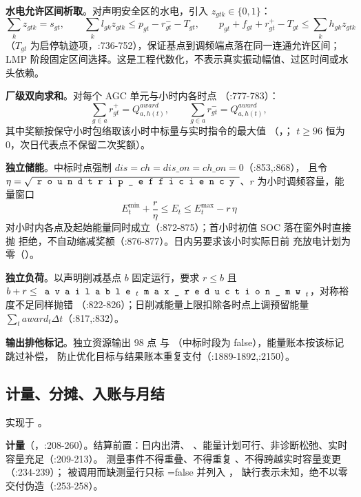 \textbf{水电允许区间析取}。对声明安全区的水电，引入 $z_{gtk}\in\{0,1\}$：
\begin{equation}
 \sum_k z_{gtk}=s_{gt},\qquad
 \sum_k l_{gk}z_{gtk}\le p_{gt}-r^-_{gt}-T_{gt},\qquad
 p_{gt}+f_{gt}+r^+_{gt}-T_{gt}\le\sum_k h_{gk}z_{gtk}
\end{equation}
（$T_{gt}$ 为启停轨迹项，:736-752），保证基点到调频端点落在同一连通允许区间；
LMP 阶段固定区间选择。这是工程代数化，不表示真实振动幅值、过区时间或水头依赖。

\textbf{厂级双向求和}。对每个 AGC 单元与小时内各时点
（:777-783）：
\begin{equation}
 \sum_{g\in a}r^+_{gt}=Q^{award}_{a,h(t)},\qquad
 \sum_{g\in a}r^-_{gt}=Q^{award}_{a,h(t)},
\end{equation}
其中奖额按保守小时包络取该小时中标量与实时指令的最大值
（，；
$t\ge96$ 恒为 0，次日代表点不保留二次奖额）。

\textbf{独立储能}。中标时点强制 $dis=ch=dis\_on=ch\_on=0$（:853,:868），
且令 $\eta=\sqrt{\fld{roundtrip\_efficiency}}$、$r$ 为小时调频容量，能量窗口
\begin{equation}
 E^{\min}_t+\frac{r}{\eta}\le E_t\le E^{\max}_t-r\,\eta
\end{equation}
对小时内各点及起始能量同时成立（:872-875）；首小时初值 SOC 落在窗外时直接抛
 拒绝，不自动缩减奖额（:876-877）。日内另要求该小时实际日前
充放电计划为零（）。

\textbf{独立负荷}。以声明削减基点 $b$ 固定运行，要求
$r\le b$ 且 $b+r\le \fld{available}_t\fld{max\_reduction\_mw}_t$，对称裕度不足同样抛错
（:822-826）；日削减能量上限扣除各时点上调预留能量
$\sum_t award_t\Delta t$（:817,:832）。

\textbf{输出排他标记}。独立资源输出 98 点  与
（中标时段为 false），能量账本按该标记跳过补偿，
防止优化目标与结果账本重复支付（:1889-1892,:2150）。

\subsection{计量、分摊、入账与月结}
实现于 。

\textbf{计量}（，:208-260）。结算前置：日内出清、
、能量计划可行、非诊断松弛、实时容量充足（:209-213）。
测量事件不得重叠、不得重复 、不得跨越实时容量变更（:234-239）；
被调用而缺测量行只标 =false 并列入 ，
缺行表示未知，绝不以零交付伪造（:253-258）。

